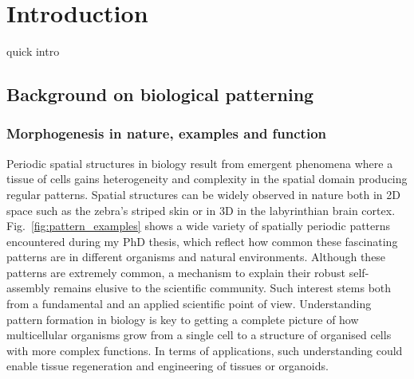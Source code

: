 \chapter{Introduction}\label{introduction}

quick intro
\section{Background on biological patterning}
\subsection{Morphogenesis in nature, examples and function}
Periodic spatial structures in biology result from emergent phenomena where a tissue of cells gains heterogeneity and complexity in the spatial domain producing regular patterns.
Spatial structures can be widely observed in nature both in \acrfull{2D} space such as the zebra's striped skin or in \acrfull{3D} in the labyrinthian brain cortex.
Fig.~\ref{fig:pattern_examples} shows a wide variety of spatially periodic patterns encountered during my PhD thesis, which reflect how common these fascinating patterns are in different organisms and natural environments.
Although these patterns are extremely common, a mechanism to explain their robust self-assembly remains elusive to the scientific community.
Such interest stems both from a fundamental and an applied scientific point of view.
Understanding pattern formation in biology is key to getting a complete picture of how multicellular organisms grow from a single cell to a structure of organised cells with more complex functions.
In terms of applications, such understanding could enable tissue regeneration and engineering of tissues or organoids.


